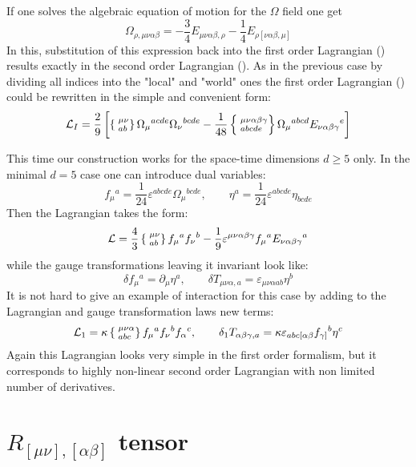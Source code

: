 \documentclass[a4paper,12pt]{article}
\begin{document}
If one solves the algebraic equation of motion for the $\Omega$ field
one get
\begin{equation}
\Omega_{\rho,\mu\nu\alpha\beta} = - \frac{3}{4}
E_{\mu\nu\alpha\beta,\rho} - \frac{1}{4} E_{\rho[\nu\alpha\beta,\mu]}
\end{equation}
In this, substitution of this expression back into the first order
Lagrangian () results exactly in the second order Lagrangian ().
As in the previous case by dividing all indices into the "local" and
"world" ones the first order Lagrangian () could be rewritten in the
simple and convenient form:
\begin{equation}
{\cal L}_I = \frac{2}{9} \left[ \left\{ \phantom{|}^{\mu\nu}_{ab}
\right\} \Omega_\mu{}^{acde} \Omega_\nu{}^{bcde} - \frac{1}{48}
\left\{ \phantom{|}^{\mu\nu\alpha\beta\gamma}_{abcde} \right\}
\Omega_\mu{}^{abcd} E_{\nu\alpha\beta\gamma}{}^e \right]
\end{equation}

This time our construction works for the space-time dimensions
$d \ge 5$ only. In the minimal $d=5$ case one can introduce dual
variables:
\begin{equation}
f_\mu{}^a = \frac{1}{24} \varepsilon^{abcde} \Omega_\mu{}^{bcde},
\qquad \eta^a = \frac{1}{24} \varepsilon^{abcde} \eta_{bcde}
\end{equation}
Then the Lagrangian takes the form:
\begin{equation}
{\cal L} = \frac{4}{3} \left\{ \phantom{|}^{\mu\nu}_{ab} \right\}
f_\mu{}^a f_\nu{}^b - \frac{1}{9}
\varepsilon^{\mu\nu\alpha\beta\gamma} f_\mu{}^a
E_{\nu\alpha\beta\gamma}{}^a
\end{equation}
while the gauge transformations leaving it invariant look like:
$$
\delta f_\mu{}^a = \partial_\mu \eta^a, \qquad \delta
T_{\mu\nu\alpha,a} = \varepsilon_{\mu\nu\alpha ab} \eta^b
$$
It is not hard to give an example of interaction for this case by
adding to the Lagrangian and gauge transformation laws new terms:
\begin{equation}
{\cal L}_1 =\kappa \left\{ \phantom{|}^{\mu\nu\alpha}_{abc} \right\}
f_\mu{}^a f_\nu{}^b f_\alpha{}^c, \qquad \delta_1
T_{\alpha\beta\gamma,a} = \kappa
\varepsilon_{abc[\alpha\beta} f_{\gamma]}{}^b \eta^c
\end{equation}
Again this Lagrangian looks very simple in the first order formalism,
but it corresponds to highly non-linear second order Lagrangian with
non limited number of derivatives.


\section{$R_{[\mu\nu],[\alpha\beta]}$ tensor}
\end{document}
